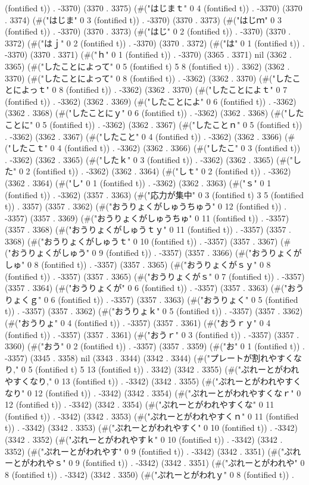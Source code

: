 (fontified t)) . -3370) (3370 . 3375) (#("はじまｔ" 0 4 (fontified t)) . -3370) (3370 . 3374) (#("はじま" 0 3 (fontified t)) . -3370) (3370 . 3373) (#("はじｍ" 0 3 (fontified t)) . -3370) (3370 . 3373) (#("はじ" 0 2 (fontified t)) . -3370) (3370 . 3372) (#("はｊ" 0 2 (fontified t)) . -3370) (3370 . 3372) (#("は" 0 1 (fontified t)) . -3370) (3370 . 3371) (#("ｈ" 0 1 (fontified t)) . -3370) (3365 . 3371) nil (3362 . 3365) (#("したことによって" 0 5 (fontified t) 5 8 (fontified t)) . 3362) (3362 . 3370) (#("したことによって" 0 8 (fontified t)) . -3362) (3362 . 3370) (#("したことによっｔ" 0 8 (fontified t)) . -3362) (3362 . 3370) (#("したことによｔ" 0 7 (fontified t)) . -3362) (3362 . 3369) (#("したことによ" 0 6 (fontified t)) . -3362) (3362 . 3368) (#("したことにｙ" 0 6 (fontified t)) . -3362) (3362 . 3368) (#("したことに" 0 5 (fontified t)) . -3362) (3362 . 3367) (#("したことｎ" 0 5 (fontified t)) . -3362) (3362 . 3367) (#("したこと" 0 4 (fontified t)) . -3362) (3362 . 3366) (#("したこｔ" 0 4 (fontified t)) . -3362) (3362 . 3366) (#("したこ" 0 3 (fontified t)) . -3362) (3362 . 3365) (#("したｋ" 0 3 (fontified t)) . -3362) (3362 . 3365) (#("した" 0 2 (fontified t)) . -3362) (3362 . 3364) (#("しｔ" 0 2 (fontified t)) . -3362) (3362 . 3364) (#("し" 0 1 (fontified t)) . -3362) (3362 . 3363) (#("ｓ" 0 1 (fontified t)) . -3362) (3357 . 3363) (#("応力が集中" 0 3 (fontified t) 3 5 (fontified t)) . 3357) (3357 . 3362) (#("おうりょくがしゅうちゅう" 0 12 (fontified t)) . -3357) (3357 . 3369) (#("おうりょくがしゅうちゅ" 0 11 (fontified t)) . -3357) (3357 . 3368) (#("おうりょくがしゅうｔｙ" 0 11 (fontified t)) . -3357) (3357 . 3368) (#("おうりょくがしゅうｔ" 0 10 (fontified t)) . -3357) (3357 . 3367) (#("おうりょくがしゅう" 0 9 (fontified t)) . -3357) (3357 . 3366) (#("おうりょくがしゅ" 0 8 (fontified t)) . -3357) (3357 . 3365) (#("おうりょくがｓｙ" 0 8 (fontified t)) . -3357) (3357 . 3365) (#("おうりょくがｓ" 0 7 (fontified t)) . -3357) (3357 . 3364) (#("おうりょくが" 0 6 (fontified t)) . -3357) (3357 . 3363) (#("おうりょくｇ" 0 6 (fontified t)) . -3357) (3357 . 3363) (#("おうりょく" 0 5 (fontified t)) . -3357) (3357 . 3362) (#("おうりょｋ" 0 5 (fontified t)) . -3357) (3357 . 3362) (#("おうりょ" 0 4 (fontified t)) . -3357) (3357 . 3361) (#("おうｒｙ" 0 4 (fontified t)) . -3357) (3357 . 3361) (#("おうｒ" 0 3 (fontified t)) . -3357) (3357 . 3360) (#("おう" 0 2 (fontified t)) . -3357) (3357 . 3359) (#("お" 0 1 (fontified t)) . -3357) (3345 . 3358) nil (3343 . 3344) (3342 . 3344) (#("プレートが割れやすくなり," 0 5 (fontified t) 5 13 (fontified t)) . 3342) (3342 . 3355) (#("ぷれーとがわれやすくなり," 0 13 (fontified t)) . -3342) (3342 . 3355) (#("ぷれーとがわれやすくなり" 0 12 (fontified t)) . -3342) (3342 . 3354) (#("ぷれーとがわれやすくなｒ" 0 12 (fontified t)) . -3342) (3342 . 3354) (#("ぷれーとがわれやすくな" 0 11 (fontified t)) . -3342) (3342 . 3353) (#("ぷれーとがわれやすくｎ" 0 11 (fontified t)) . -3342) (3342 . 3353) (#("ぷれーとがわれやすく" 0 10 (fontified t)) . -3342) (3342 . 3352) (#("ぷれーとがわれやすｋ" 0 10 (fontified t)) . -3342) (3342 . 3352) (#("ぷれーとがわれやす" 0 9 (fontified t)) . -3342) (3342 . 3351) (#("ぷれーとがわれやｓ" 0 9 (fontified t)) . -3342) (3342 . 3351) (#("ぷれーとがわれや" 0 8 (fontified t)) . -3342) (3342 . 3350) (#("ぷれーとがわれｙ" 0 8 (fontified t)) . 